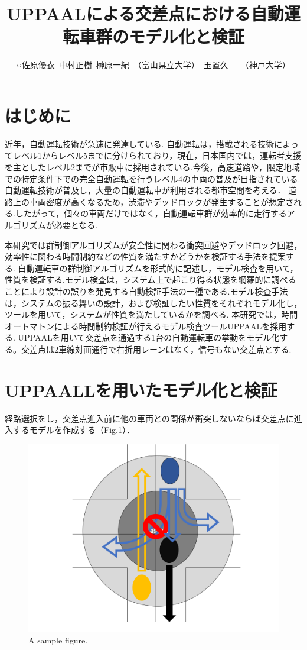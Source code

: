 \documentclass{jarticle}
\begin{document}
\title{UPPAALによる交差点における自動運転車群のモデル化と検証}
\author{○佐原優衣\ 中村正樹\ 榊原一紀\ （富山県立大学）\ 玉置久　\ （神戸大学）}



\maketitle\thispagestyle{empty}
\pagestyle{empty}

\section{はじめに}
近年，自動運転技術が急速に発達している. 自動運転は，搭載される技術によってレベル1からレベル5までに分けられており，現在，日本国内では，運転者支援を主としたレベル2までが市販車に採用されている.今後，高速道路や，限定地域での特定条件下での完全自動運転を行うレベル4の車両の普及が目指されている.
自動運転技術が普及し，大量の自動運転車が利用される都市空間を考える．
道路上の車両密度が高くなるため，渋滞やデッドロックが発生することが想定される.したがって，個々の車両だけではなく，自動運転車群が効率的に走行するアルゴリズムが必要となる.
	
本研究では群制御アルゴリズムが安全性に関わる衝突回避やデッドロック回避，効率性に関わる時間制約などの性質を満たすかどうかを検証する手法を提案する.
自動運転車の群制御アルゴリズムを形式的に記述し，モデル検査を用いて，性質を検証する.モデル検査は，システム上で起こり得る状態を網羅的に調べることにより設計の誤りを発見する自動検証手法の一種である.モデル検査手法は，システムの振る舞いの設計，および検証したい性質をそれぞれモデル化し，ツールを用いて，システムが性質を満たしているかを調べる.
本研究では，時間オートマトン\cite{u3}による時間制約検証が行えるモデル検査ツールUPPAAL\cite{u1,u2}を採用する.
UPPAALを用いて交差点を通過する1台の自動運転車の挙動をモデル化する。交差点は2車線対面通行で右折用レーンはなく，信号もない交差点とする.
\section{UPPAALLを用いたモデル化と検証}
経路選択をし，交差点進入前に他の車両との関係が衝突しないならば交差点に進入するモデルを作成する（Fig.\ref{model}）．

\begin{figure}[t]
  \centering
\ifLaTeXe
  \includegraphics[width=0.5\linewidth]{model.png}
\fi
  \caption{A sample figure.}
  \label{model}
\end{figure}
\end{document}
